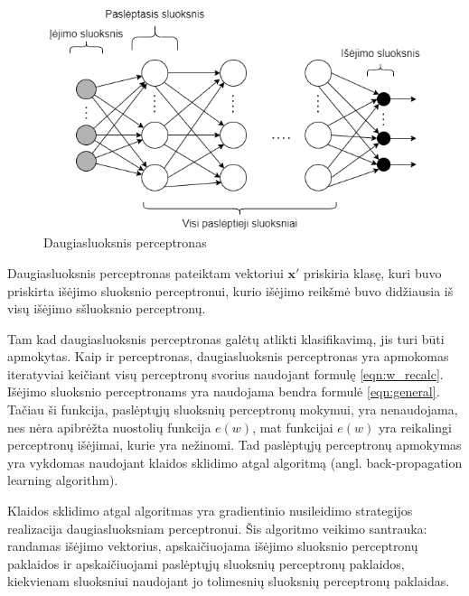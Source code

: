 \begin{figure}[H]
	\centering
	\includegraphics[scale=0.5]{img/neural_network.png}
	\caption{Daugiasluoksnis perceptronas}
	\label{img:nn}
\end{figure}

Daugiasluoksnis perceptronas pateiktam vektoriui $\boldsymbol{x}'$ priskiria klasę, kuri buvo priskirta išėjimo sluoksnio perceptronui, kurio išėjimo reikšmė buvo didžiausia iš visų išėjimo sšluoksnio perceptronų.

Tam kad daugiasluoksnis perceptronas galėtų atlikti klasifikavimą, jis turi būti apmokytas. Kaip ir perceptronas, daugiasluoksnis perceptronas yra apmokomas iteratyviai keičiant visų perceptronų svorius naudojant formulę \ref{eqn:w_recalc}. Išėjimo sluoksnio perceptronams yra naudojama bendra formulė \ref{eqn:general}. Tačiau ši funkcija, paslėptųjų sluoksnių perceptronų mokymui, yra nenaudojama, nes nėra apibrėžta nuostolių funkcija $e(w)$, mat funkcijai $e(w)$ yra reikalingi perceptronų išėjimai, kurie yra nežinomi. Tad paslėptųjų perceptronų apmokymas yra vykdomas naudojant klaidos sklidimo atgal algoritmą (angl. back-propagation learning algorithm).

Klaidos sklidimo atgal algoritmas yra gradientinio nusileidimo strategijos realizacija daugiasluoksniam perceptronui. Šis algoritmo veikimo santrauka: randamas išėjimo vektorius, apskaičiuojama išėjimo sluoksnio perceptronų paklaidos ir apskaičiuojami paslėptųjų sluoksnių perceptronų paklaidos, kiekvienam sluoksniui naudojant jo tolimesnių sluoksnių perceptronų paklaidas.